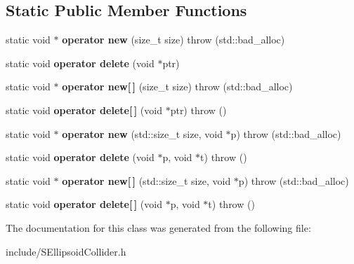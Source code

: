 \subsection*{Static Public Member Functions}
\begin{DoxyCompactItemize}
\item 
static void $\ast$ {\bfseries operator new} (size\+\_\+t size)  throw (std\+::bad\+\_\+alloc)\hypertarget{classirr_1_1core_1_1SEllipsoidCollider_a436f2fbcd8c2f73c13c894ddb76bbb25}{}\label{classirr_1_1core_1_1SEllipsoidCollider_a436f2fbcd8c2f73c13c894ddb76bbb25}

\item 
static void {\bfseries operator delete} (void $\ast$ptr)\hypertarget{classirr_1_1core_1_1SEllipsoidCollider_ae0972fe33534532d462c052a7bf003a6}{}\label{classirr_1_1core_1_1SEllipsoidCollider_ae0972fe33534532d462c052a7bf003a6}

\item 
static void $\ast$ {\bfseries operator new\mbox{[}$\,$\mbox{]}} (size\+\_\+t size)  throw (std\+::bad\+\_\+alloc)\hypertarget{classirr_1_1core_1_1SEllipsoidCollider_a1d07bd391546cbc521e5b7eaddd55c2c}{}\label{classirr_1_1core_1_1SEllipsoidCollider_a1d07bd391546cbc521e5b7eaddd55c2c}

\item 
static void {\bfseries operator delete\mbox{[}$\,$\mbox{]}} (void $\ast$ptr)  throw ()\hypertarget{classirr_1_1core_1_1SEllipsoidCollider_a9145b6109d022e52bd0a72f8a8ce4964}{}\label{classirr_1_1core_1_1SEllipsoidCollider_a9145b6109d022e52bd0a72f8a8ce4964}

\item 
static void $\ast$ {\bfseries operator new} (std\+::size\+\_\+t size, void $\ast$p)  throw (std\+::bad\+\_\+alloc)\hypertarget{classirr_1_1core_1_1SEllipsoidCollider_acc0f1c32d439723bebc30dde19287e06}{}\label{classirr_1_1core_1_1SEllipsoidCollider_acc0f1c32d439723bebc30dde19287e06}

\item 
static void {\bfseries operator delete} (void $\ast$p, void $\ast$t)  throw ()\hypertarget{classirr_1_1core_1_1SEllipsoidCollider_a09fdf709e3145b5626f699d4c60cdd03}{}\label{classirr_1_1core_1_1SEllipsoidCollider_a09fdf709e3145b5626f699d4c60cdd03}

\item 
static void $\ast$ {\bfseries operator new\mbox{[}$\,$\mbox{]}} (std\+::size\+\_\+t size, void $\ast$p)  throw (std\+::bad\+\_\+alloc)\hypertarget{classirr_1_1core_1_1SEllipsoidCollider_ac292c3162a8313ca2617f0d8e6131b84}{}\label{classirr_1_1core_1_1SEllipsoidCollider_ac292c3162a8313ca2617f0d8e6131b84}

\item 
static void {\bfseries operator delete\mbox{[}$\,$\mbox{]}} (void $\ast$p, void $\ast$t)  throw ()\hypertarget{classirr_1_1core_1_1SEllipsoidCollider_a2cbbe3996601a0d411e498202cbe6822}{}\label{classirr_1_1core_1_1SEllipsoidCollider_a2cbbe3996601a0d411e498202cbe6822}

\end{DoxyCompactItemize}


The documentation for this class was generated from the following file\+:\begin{DoxyCompactItemize}
\item 
include/S\+Ellipsoid\+Collider.\+h\end{DoxyCompactItemize}
